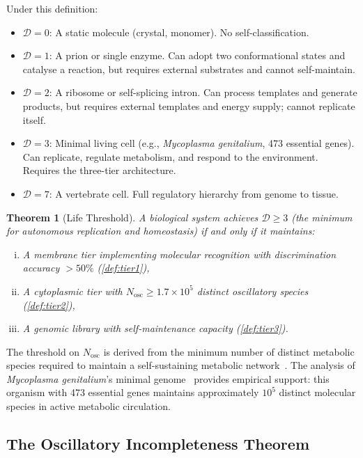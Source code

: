 \documentclass[11pt,twocolumn,a4paper]{article}
\newtheorem{theorem}{Theorem}[section]
\theoremstyle{definition}
\theoremstyle{remark}
\newcommand{\Nosc}{N_{\mathrm{osc}}}
\newcommand{\Dcat}{\mathcal{D}}
\begin{document}
Under this definition:
\begin{itemize}
  \item $\Dcat = 0$: A static molecule (crystal, monomer). No self-classification.
  \item $\Dcat = 1$: A prion or single enzyme. Can adopt two conformational states and catalyse a reaction, but requires external substrates and cannot self-maintain.
  \item $\Dcat = 2$: A ribosome or self-splicing intron. Can process templates and generate products, but requires external templates and energy supply; cannot replicate itself.
  \item $\Dcat = 3$: Minimal living cell (e.g., \textit{Mycoplasma genitalium}, 473 essential genes). Can replicate, regulate metabolism, and respond to the environment. Requires the three-tier architecture.
  \item $\Dcat = 7$: A vertebrate cell. Full regulatory hierarchy from genome to tissue.
\end{itemize}

\begin{theorem}[Life Threshold]
\label{thm:life_threshold}
A biological system achieves $\Dcat \geq 3$ (the minimum for autonomous replication and homeostasis) if and only if it maintains:
\begin{enumerate}[(i)]
  \item A membrane tier implementing molecular recognition with discrimination accuracy $>50\%$ (\cref{def:tier1}),
  \item A cytoplasmic tier with $\Nosc \geq 1.7 \times 10^5$ distinct oscillatory species (\cref{def:tier2}),
  \item A genomic library with self-maintenance capacity (\cref{def:tier3}).
\end{enumerate}
\end{theorem}

The threshold on $\Nosc$ is derived from the minimum number of distinct metabolic species required to maintain a self-sustaining metabolic network~\cite{Kauffman1986}. The analysis of \textit{Mycoplasma genitalium}'s minimal genome~\cite{Glass2006} provides empirical support: this organism with 473 essential genes maintains approximately $10^5$ distinct molecular species in active metabolic circulation.

\subsection{The Oscillatory Incompleteness Theorem}
\end{document}
